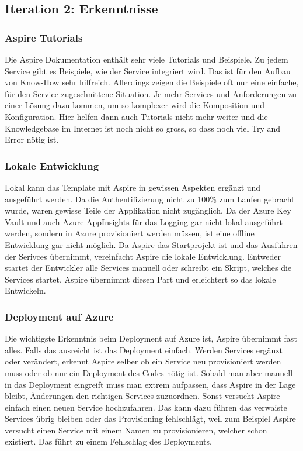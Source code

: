     \subsection{Iteration 2: Erkenntnisse}

        \subsubsection{Aspire Tutorials}
            Die Aspire Dokumentation enthält sehr viele Tutorials und Beispiele. Zu jedem Service gibt es Beispiele, wie der Service integriert wird. Das ist für den Aufbau von Know-How sehr hilfreich. Allerdings zeigen die Beispiele oft nur eine einfache, für den Service zugeschnittene Situation. Je mehr Services und Anforderungen zu einer Lösung dazu kommen, um so komplexer wird die Komposition und Konfiguration. Hier helfen dann auch Tutorials nicht mehr weiter und die Knowledgebase im Internet ist noch nicht so gross, so dass noch viel Try and Error nötig ist.

        \subsubsection{Lokale Entwicklung}
            Lokal kann das Template mit Aspire in gewissen Aspekten ergänzt und ausgeführt werden. Da die Authentifizierung nicht zu 100\% zum Laufen gebracht wurde, waren gewisse Teile der Applikation nicht zugänglich. Da der Azure Key Vault und auch Azure AppInsights für das Logging gar nicht lokal ausgeführt werden, sondern in Azure provisioniert werden müssen, ist eine offline Entwicklung gar nicht möglich. Da Aspire das Startprojekt ist und das Ausführen der Serivces übernimmt, vereinfacht Aspire die lokale Entwicklung. Entweder startet der Entwickler alle Services manuell oder schreibt ein Skript, welches die Services startet. Aspire übernimmt diesen Part und erleichtert so das lokale Entwickeln.

        \subsubsection{Deployment auf Azure}
            Die wichtigste Erkenntnis beim Deployment auf Azure ist, Aspire übernimmt fast alles. Falls das ausreicht ist das Deployment einfach. Werden Services ergänzt oder verändert, erkennt Aspire selber ob ein Service neu provisioniert werden muss oder ob nur ein Deployment des Codes nötig ist. Sobald man aber manuell in das Deployment eingreift muss man extrem aufpassen, dass Aspire in der Lage bleibt, Änderungen den richtigen Services zuzuordnen. Sonst versucht Aspire einfach einen neuen Service hochzufahren. Das kann dazu führen das verwaiste Services übrig bleiben oder das Provisioning fehlschlägt, weil zum Beispiel Aspire versucht einen Service mit einem Namen zu provisionieren, welcher schon existiert. Das führt zu einem Fehlschlag des Deployments.

